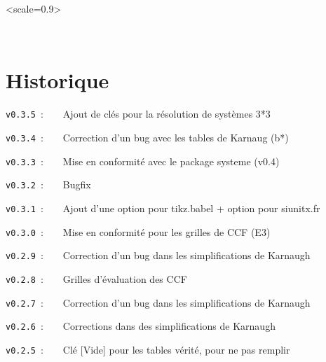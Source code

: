 \documentclass[french,a4paper,11pt]{article}
\providecommand\tikzlogo{Ti\textit{k}Z}
\providecommand\TeXLive{\TeX{}Live\xspace}
\let\TikZ\tikzlogo
\newcommand\TableauDocumentation{%
	\begin{tblr}{width=\linewidth,colspec={X[c]X[c]X[c]X[c]X[c]X[c]},cells={font=\large\sffamily}}
		{\LaTeX} & {\hologo{pdfLaTeX}} & {\hologo{LuaLaTeX}} & {\TikZ} & {\TeXLive} & {\hologo{MiKTeX}} \\
	\end{tblr}
}
\begin{document}
{{\vspace{0.5cm}

\hfill
\begin{GrapheTikz}[Unite=0.75cm,CouleurSommets={gray/blue},Epaisseur={very thick/thick},CouleurFleches=orange]<scale=0.9>
\end{GrapheTikz}
\hfill~
\hfill~


%
%
%
%
%

\newpage

\hypertarget{matoc}{}

\tableofcontents

\vfill

\newpage

\section{Historique}

\verb|v0.3.5|~:~~~~Ajout de clés pour la résolution de systèmes 3*3

\verb|v0.3.4|~:~~~~Correction d'un bug avec les tables de Karnaug (b*)

\verb|v0.3.3|~:~~~~Mise en conformité avec le package \textsf{systeme (v0.4)}

\verb|v0.3.2|~:~~~~Bugfix

\verb|v0.3.1|~:~~~~Ajout d'une option pour \textsf{tikz.babel} + option pour \textsf{siunitx.fr}

\verb|v0.3.0|~:~~~~Mise en conformité pour les grilles de CCF (E3)

\verb|v0.2.9|~:~~~~Correction d'un bug dans les simplifications de Karnaugh

\verb|v0.2.8|~:~~~~Grilles d'évaluation des CCF

\verb|v0.2.7|~:~~~~Correction d'un bug dans les simplifications de Karnaugh

\verb|v0.2.6|~:~~~~Corrections dans des simplifications de Karnaugh

\verb|v0.2.5|~:~~~~Clé \textsf{[Vide]} pour les tables vérité, pour ne pas remplir

}}
\end{document}
